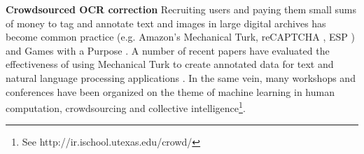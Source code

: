 \documentclass[10pt, conference, compsocconf]{IEEEtran}
\begin{document}

\noindent \textbf{Crowdsourced OCR correction }Recruiting users and paying them small sums of money to tag and annotate text and images in large digital archives has become common practice (e.g. Amazon's Mechanical Turk, reCAPTCHA \cite{vonAhn_08}, ESP \cite{vonAhn_04}) and Games with a Purpose \cite{Ahn_08w}. A number of recent papers have evaluated the effectiveness of using Mechanical Turk to create annotated data for text and natural language processing applications \cite{Snow_08}. In the same vein, many workshops and conferences have been organized on the theme of machine learning in human computation, crowdsourcing and collective intelligence\footnote{See http://ir.ischool.utexas.edu/crowd/}. 
\end{document}
